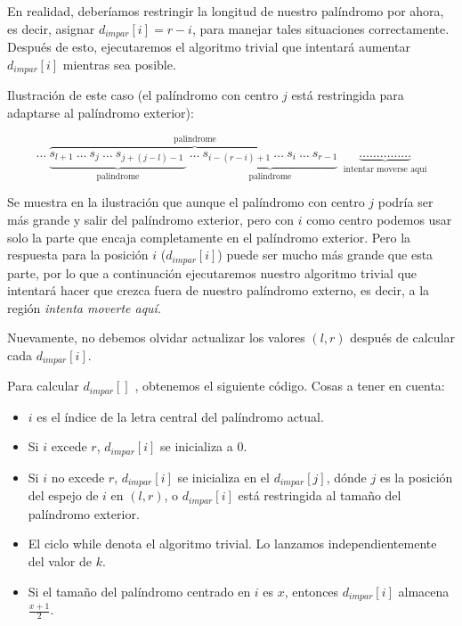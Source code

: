 \begin{itemize}
	En realidad, deberíamos restringir la longitud de nuestro palíndromo por ahora, es decir, asignar $d_{impar}[i] = r - i$, para manejar tales situaciones correctamente. Después de esto, ejecutaremos el algoritmo trivial que intentará aumentar $d_{impar}[i]$ mientras sea posible.
	
	Ilustración de este caso (el palíndromo con centro $j$ está restringida para adaptarse al palíndromo exterior):
	
	$$\ldots\ \overbrace{ \underbrace{ s_{l+1}\ \ldots\ s_j\ \ldots\ s_{j+(j-l)-1}\ }_\text{palindrome}\ \ldots\ \underbrace{ s_{i-(r-i)+1}\ \ldots\ s_i\ \ldots\ s_{r-1} }_\text{palindrome}\ }^\text{palindrome}\ \underbrace{ \ldots \ldots \ldots \ldots \ldots }_\text{intentar moverse aquí}$$
	
	Se muestra en la ilustración que aunque el palíndromo con centro $j$ podría ser más grande y salir del palíndromo exterior, pero con $i$ como centro podemos usar solo la parte que encaja completamente en el palíndromo exterior. Pero la respuesta para la posición $i$ ($d_{impar}[i]$) puede ser mucho más grande que esta parte, por lo que a continuación ejecutaremos nuestro algoritmo trivial que intentará hacer que crezca fuera de nuestro palíndromo externo, es decir, a la región \emph{intenta moverte aquí}.
	
\end{itemize}

Nuevamente, no debemos olvidar actualizar los valores $(l,r)$ después de calcular cada $d_{impar}[i]$.

Para calcular $d_{impar}[]$ , obtenemos el siguiente código. Cosas a tener en cuenta:

\begin{itemize}
	\item $i$ es el índice de la letra central del palíndromo actual.
	\item Si $i$ excede $r$, $d_{impar}[i]$ se inicializa a 0.
	\item Si $i$ no excede $r$, $d_{impar}[i]$ se inicializa en el $d_{impar}[j]$, dónde $j$ es la posición del espejo de $i$ en $(l,r)$, o $d_{impar}[i]$ está restringida al tamaño del palíndromo exterior.
	\item El ciclo while denota el algoritmo trivial. Lo lanzamos independientemente del valor de $k$.
	\item Si el tamaño del palíndromo centrado en $i$ es $x$, entonces $d_{impar}[i]$ almacena $\frac{x+1}{2}$.
\end{itemize}

